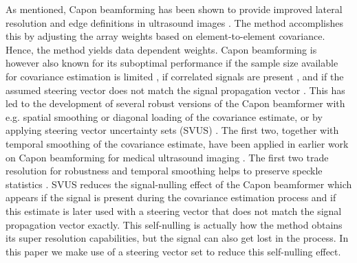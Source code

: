 \documentclass[journal]{IEEEtran}
\begin{document}
As mentioned, Capon beamforming has been shown to provide improved lateral resolution and edge definitions in ultrasound images \cite{Synnevag2007, Synnevag2009, Chen2011}. The method accomplishes this by adjusting the array weights based on element-to-element covariance. Hence, the method yields data dependent weights. Capon beamforming is however also known for its suboptimal performance if the sample size available for covariance estimation is limited \cite{Mestre2006}, if correlated signals are present \cite{Widrow1982}, and if the assumed steering vector does not match the signal propagation vector \cite{Wax1996, Wax1996a}. This has led to the development of several robust versions of the Capon beamformer with e.g. spatial smoothing \cite{Shan1985} or diagonal loading \cite{JianLi2003} of the covariance estimate, or by applying steering vector uncertainty sets (SVUS) \cite{Lorenz2005, Rubsamen2013}. The first two, together with temporal smoothing of the covariance estimate, have been applied in earlier work on Capon beamforming for medical ultrasound imaging \cite{Synnevag2009}. The first two trade resolution for robustness and temporal smoothing helps to preserve speckle statistics \cite{Synnevag2007a}. SVUS reduces the signal-nulling effect of the Capon beamformer which appears if the signal is present during the covariance estimation process and if this estimate is later used with a steering vector that does not match the signal propagation vector exactly. This self-nulling is actually how the method obtains its super resolution capabilities, but the signal can also get lost in the process. In this paper we make use of a steering vector set to reduce this self-nulling effect.
\end{document}
